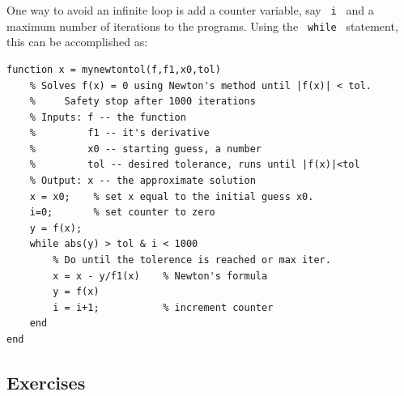 One way to avoid an infinite loop is add a counter variable, say
\verb& i & and a maximum number of iterations to the programs.
Using the \verb& while & statement, this can be accomplished as:
\begin{lstlisting}
function x = mynewtontol(f,f1,x0,tol)
    % Solves f(x) = 0 using Newton's method until |f(x)| < tol.
    %     Safety stop after 1000 iterations
    % Inputs: f -- the function
    %         f1 -- it's derivative
    %         x0 -- starting guess, a number
    %         tol -- desired tolerance, runs until |f(x)|<tol 
    % Output: x -- the approximate solution
    x = x0;    % set x equal to the initial guess x0. 
    i=0;       % set counter to zero 
    y = f(x);
    while abs(y) > tol & i < 1000  
        % Do until the tolerence is reached or max iter.
        x = x - y/f1(x)    % Newton's formula
        y = f(x)
        i = i+1;           % increment counter
    end
end
\end{lstlisting}


\newpage

\subsection*{Exercises}

